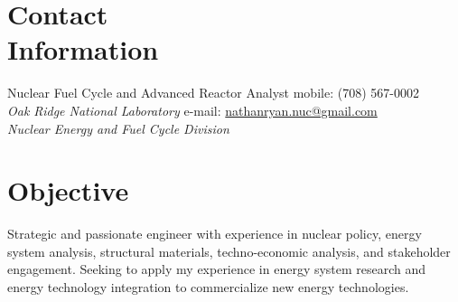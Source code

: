 \documentclass[margin,line]{resume}
\begin{document}
\begin{resume}

%


    \section{\mysidestyle Contact\\Information}
    Nuclear Fuel Cycle and Advanced Reactor Analyst \hfill mobile: (708) 567-0002 \vspace{0mm}\\\vspace{0mm}%
        \textsl{Oak Ridge National Laboratory}
        \hfill e-mail: \href{mailto:nathanryan.nuc@gmail.com}{nathanryan.nuc@gmail.com}       \vspace{0mm}\\\vspace{0mm}%
    \textsl{Nuclear Energy and Fuel Cycle Division}

    \section{\mysidestyle Objective}
                Strategic and passionate engineer with experience in nuclear policy, energy system analysis, structural materials, techno-economic analysis, and stakeholder engagement. Seeking to apply my experience in energy system research and energy technology integration to commercialize new energy technologies.

\end{resume}
\end{document}
